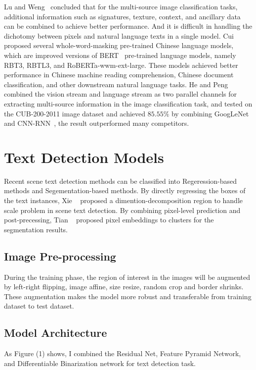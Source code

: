 \documentclass[review]{cvpr}
\begin{document}
  Lu and Weng~\cite{lu2007survey} concluded that for the multi-source image classification tasks, additional information such as signatures, texture, context, and ancillary data can be combined to achieve better performance.
And it is difficult in handling the dichotomy between pixels and natural language texts in a single model.
  Cui \etal~\cite{cui2020revisiting} proposed several whole-word-masking pre-trained Chinese language models,
which are improved versions of BERT~\cite{devlin2019bert} pre-trained language models, namely RBT3, RBTL3, and RoBERTa-wwm-ext-large.
These models achieved better performance in Chinese machine reading comprehension, Chinese document classification, and other downstream natural language tasks.
  He and Peng~\cite{he2017fine} combined the vision stream and language stream as two parallel channels for extracting multi-source information in the image classification task,
and tested on the CUB-200-2011 image dataset and achieved $85.55\%$ by combining GoogLeNet~\cite{szegedy2015going} and CNN-RNN~\cite{reed2016learning}, the result outperformed many competitors.


\section{Text Detection Models}



  Recent scene text detection methods can be classified into Regeression-based methods and Segementation-based methods.
  By directly regressing the boxes of the text instances, Xie \etal~\cite{xie2019scene} proposed a dimention-decomposition region to handle scale problem in scene text detection.
  By combining pixel-level prediction and post-precessing, Tian \etal~\cite{tian2019learning} proposed pixel embeddings to clusters for the segmentation results.

\subsection{Image Pre-processing}

  During the training phase, the region of interest in the images will be augmented by left-right flipping, image affine, size resize, random crop and border shrinks.
  These augmentation makes the model more robust and transferable from training dataset to test dataset.

\subsection{Model Architecture}
  As Figure (1) shows, I combined the Residual Net, Feature Pyramid Network, and Differentiable Binarization network for text detection task.
\end{document}
